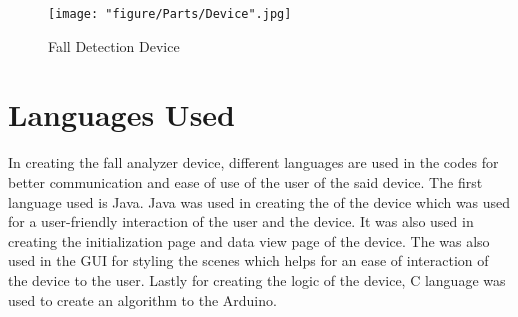 \begin{figure}[htbp]
	\centering
		\texttt{[image: "figure/Parts/Device".jpg]}
	\caption{Fall Detection Device}
	\label{fig:Device}
\end{figure}

\section{Languages Used}

In creating the fall analyzer device, different languages are used in the codes for better communication and ease of use of the user of the said device. The first language used is Java. Java was used in creating the  of the device which was used for a user-friendly interaction of the user and the device. It was also used in creating the initialization page and data view page of the device. The  was also used in the GUI for styling the scenes which helps for an ease of interaction of the device to the user. Lastly for creating the logic of the device, C language was used to create an algorithm to the Arduino.